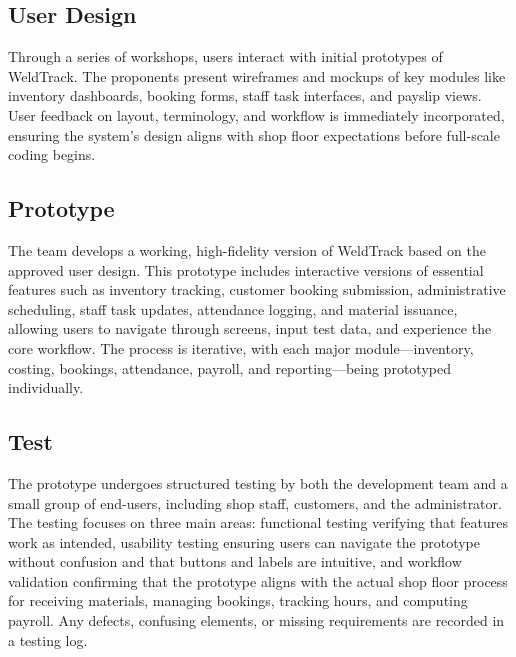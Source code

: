 \documentclass[12pt, letterpaper]{article}
\begin{document}
 \subsection*{User Design}
\hspace*{2em} Through a series of workshops, users interact with initial prototypes of WeldTrack. The proponents present wireframes and mockups of key modules like inventory dashboards, booking forms, staff task interfaces, and payslip views. User feedback on layout, terminology, and workflow is immediately incorporated, ensuring the system's design aligns with shop floor expectations before full-scale coding begins.

 \subsection*{Prototype}
\hspace*{2em} The team develops a working, high-fidelity version of WeldTrack based on the approved user design. This prototype includes interactive versions of essential features such as inventory tracking, customer booking submission, administrative scheduling, staff task updates, attendance logging, and material issuance, allowing users to navigate through screens, input test data, and experience the core workflow. The process is iterative, with each major module—inventory, costing, bookings, attendance, payroll, and reporting—being prototyped individually.

 \subsection*{Test}
\hspace*{2em} The prototype undergoes structured testing by both the development team and a small group of end-users, including shop staff, customers, and the administrator. The testing focuses on three main areas: functional testing verifying that features work as intended, usability testing ensuring users can navigate the prototype without confusion and that buttons and labels are intuitive, and workflow validation confirming that the prototype aligns with the actual shop floor process for receiving materials, managing bookings, tracking hours, and computing payroll. Any defects, confusing elements, or missing requirements are recorded in a testing log.
\end{document}
